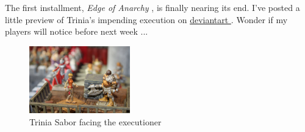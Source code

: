 The first installment, {\itshape Edge of Anarchy} , is finally nearing its end. I've posted a little preview of Trinia's impending execution on \hyperref[fig:Trinia-Sabor-facing-the-executioner-470603042]{ deviantart } . Wonder if my players will notice before next week ... \\

\begin{figure}[h]
	\centering
	\includegraphics[width=0.39\textwidth]{images/Trinia-Sabor-facing-the-executioner-470603042.jpg}
	\caption{Trinia Sabor facing the executioner}
	\label{fig:Trinia-Sabor-facing-the-executioner-470603042}
\end{figure}

